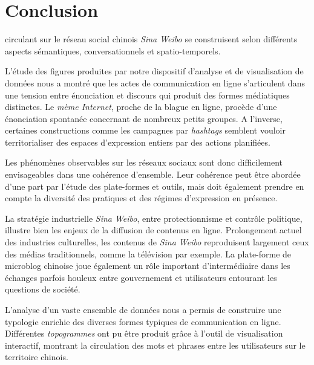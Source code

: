 \chapter*{Conclusion}


 circulant sur le réseau social chinois \textit{Sina Weibo} se construisent selon différents aspects sémantiques, conversationnels et spatio-temporels.

L'étude des figures produites par notre dispositif d'analyse et de visualisation de données nous a montré que les actes de communication en ligne s'articulent dans une tension entre énonciation et discours qui produit des formes médiatiques distinctes. Le \textit{mème Internet}, proche de la blague en ligne, procède d'une énonciation spontanée concernant de nombreux petits groupes. A l'inverse, certaines constructions comme les campagnes par \textit{hashtags} semblent vouloir territorialiser des espaces d'expression entiers par des actions planifiées.

Les phénomènes observables sur les réseaux sociaux sont donc difficilement envisageables dans une cohérence d'ensemble. Leur cohérence peut être abordée d'une part par l'étude des plate-formes et outils, mais doit également prendre en compte la diversité des pratiques et des régimes d'expression en présence.

La stratégie industrielle \textit{Sina Weibo}, entre protectionnisme et contrôle politique, illustre bien les enjeux de la diffusion de contenus en ligne. Prolongement actuel des industries culturelles, les contenus de \textit{Sina Weibo} reproduisent largement ceux des médias traditionnels, comme la télévision par exemple. La plate-forme de microblog chinoise joue également un rôle important d'intermédiaire dans les échanges parfois houleux entre gouvernement et utilisateurs entourant les questions de société.

L'analyse d'un vaste ensemble de données nous a permis de construire une typologie enrichie des diverses formes typiques de communication en ligne. 
Différentes \textit{topogrammes} ont pu être produit grâce à l'outil de visualisation interactif, montrant la circulation des mots et phrases entre les utilisateurs sur le territoire chinois. 

